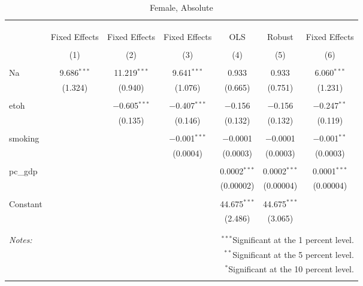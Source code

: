 \documentclass[11pt]{article}\usepackage[]{graphicx}\usepackage[]{color}
\begin{document}
\begin{table}[!htbp] \centering 
  \caption{Female, Absolute} 
  \label{} 
\begin{tabular}{@{\extracolsep{5pt}}lcccccc} 
\\[-1.8ex]\hline 
\hline \\[-1.8ex] 
\\[-1.8ex] & \multicolumn{6}{c}{ } \\ 
 & Fixed Effects & Fixed Effects & Fixed Effects & OLS & Robust & Fixed Effects \\ 
\\[-1.8ex] & (1) & (2) & (3) & (4) & (5) & (6)\\ 
\hline \\[-1.8ex] 
 Na & 9.686$^{***}$ & 11.219$^{***}$ & 9.641$^{***}$ & 0.933 & 0.933 & 6.060$^{***}$ \\ 
  & (1.324) & (0.940) & (1.076) & (0.665) & (0.751) & (1.231) \\ 
  & & & & & & \\ 
 etoh &  & $-$0.605$^{***}$ & $-$0.407$^{***}$ & $-$0.156 & $-$0.156 & $-$0.247$^{**}$ \\ 
  &  & (0.135) & (0.146) & (0.132) & (0.132) & (0.119) \\ 
  & & & & & & \\ 
 smoking &  &  & $-$0.001$^{***}$ & $-$0.0001 & $-$0.0001 & $-$0.001$^{**}$ \\ 
  &  &  & (0.0004) & (0.0003) & (0.0003) & (0.0003) \\ 
  & & & & & & \\ 
 pc\_gdp &  &  &  & 0.0002$^{***}$ & 0.0002$^{***}$ & 0.0001$^{***}$ \\ 
  &  &  &  & (0.00002) & (0.00004) & (0.00004) \\ 
  & & & & & & \\ 
 Constant &  &  &  & 44.675$^{***}$ & 44.675$^{***}$ &  \\ 
  &  &  &  & (2.486) & (3.065) &  \\ 
  & & & & & & \\ 
\hline 
\hline \\[-1.8ex] 
\textit{Notes:} & \multicolumn{6}{r}{$^{***}$Significant at the 1 percent level.} \\ 
 & \multicolumn{6}{r}{$^{**}$Significant at the 5 percent level.} \\ 
 & \multicolumn{6}{r}{$^{*}$Significant at the 10 percent level.} \\ 
 & \multicolumn{6}{r}{} \\ 
\end{tabular} 
\end{table} 
\end{document}
